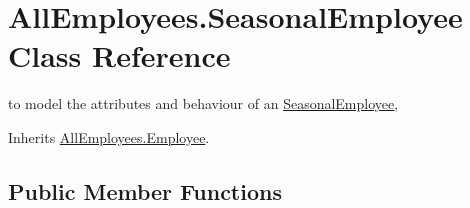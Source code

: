 \hypertarget{class_all_employees_1_1_seasonal_employee}{\section{All\-Employees.\-Seasonal\-Employee Class Reference}
\label{class_all_employees_1_1_seasonal_employee}
}


to model the attributes and behaviour of an \hyperlink{class_all_employees_1_1_seasonal_employee}{Seasonal\-Employee},  




Inherits \hyperlink{class_all_employees_1_1_employee}{All\-Employees.\-Employee}.

\subsection*{Public Member Functions}
